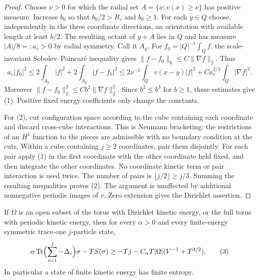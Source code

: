 \begin{proof}
Choose $\nu>0$ for which the radial set
$A=\{x:v(x)\geq\nu\}$ has positive measure. Increase $b_0$ so that
$b_0/2>R_v$ and $b_0\geq1$. For each $y\in Q$ choose, independently
in the three coordinate directions, an orientation with available
length at least $b/2$. The resulting octant of $y+A$ lies in $Q$ and
has measure $|A|/8=:a_v>0$ by radial symmetry. Call it $A_y$.
For $f_0=|Q|^{-1}\int_Q f$, the scale-invariant Sobolev--Poincar\'e
inequality gives $\|f-f_0\|_6\leq C\|\nabla f\|_2$. Thus
\[
 a_v|f_0|^2\leq2\int_{A_y}|f|^2+
 2\int_{A_y}|f-f_0|^2
 \leq2\nu^{-1}\int_Qv(x-y)|f|^2+
 C a_v^{2/3}\int_Q|\nabla f|^2.
\]
Moreover $\|f-f_0\|_2^2\leq Cb^2\|\nabla f\|_2^2$.
Since $b^2\leq b^3$ for $b\geq1$, these estimates give (1).
Positive fixed energy coefficients only change the constants.

For (2), cut configuration space according to the cube containing
each coordinate and discard cross-cube interactions. This is Neumann
bracketing: the restrictions of an $H^1$ function to the pieces are
admissible with no boundary condition at the cuts. Within a cube
containing $j\geq2$ coordinates, pair them disjointly. For each pair
apply (1) in the first coordinate with the other coordinate held
fixed, and then integrate the other coordinates. No coordinate
kinetic term or pair interaction is used twice. The number of pairs
is $\lfloor j/2\rfloor\geq j/3$. Summing the resulting inequalities
proves (2). The argument is unaffected by additional nonnegative
periodic images of $v$. Zero extension gives the Dirichlet assertion.
\end{proof}

\begin{lemma}\label{lem:kinetic-entropy}
If $\Omega$ is an open subset of the torus with Dirichlet kinetic
energy, or the full torus with periodic kinetic energy, then for
every $\alpha>0$ and every finite-energy symmetric trace-one $j$-particle state,
\begin{equation}
 \alpha\operatorname{Tr}\Bigl(\sum_{i=1}^j-\Delta_i\Bigr)\sigma
 -TS(\sigma)
 \geq-Tj-C_\alpha T|\Omega|(V^{-1}+T^{3/2}).\tag{3}\label{eq:3}
\end{equation}
In particular a state of finite kinetic energy has finite entropy.
\end{lemma}

